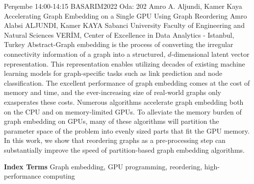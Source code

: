 
    \begin{abstract_basarim}
    {Perşembe 14:00-14:15}
    {BASARIM2022}
    {Oda: 202}
    {Amro A. Aljundi, Kamer Kaya}
    {Accelerating Graph Embedding on a Single GPU Using Graph Reordering}
    {%
    Amro Alabsi ALJUNDI, Kamer KAYA}
    {%
    }
    {%
    Sabanci University Faculty of Engineering and Natural Sciences \newline \noindent VERİM, Center of Excellence in Data Analytics - Istanbul, Turkey}
    Abstract-Graph embedding is the process of converting the irregular connectivity information of a graph into a structured, $d$-dimensional latent vector representation. This representation enables utilizing decades of existing machine learning models for graph-specific tasks such as link prediction and node classification. The excellent performance of graph embedding comes at the cost of memory and time, and the ever-increasing size of real-world graphs only exasperates these costs. Numerous algorithms accelerate graph embedding both on the CPU and on memory-limited GPUs. To alleviate the memory burden of graph embedding on GPUs, many of these algorithms will partition the parameter space of the problem into evenly sized parts that fit the GPU memory. In this work, we show that reordering graphs as a pre-processing step can substantially improve the speed of partition-based graph embedding algorithms. 
    
            \textbf{Index Terms} \newline{}Graph embedding, GPU programming, reordering, high-performance computing
    \end{abstract_basarim}
    